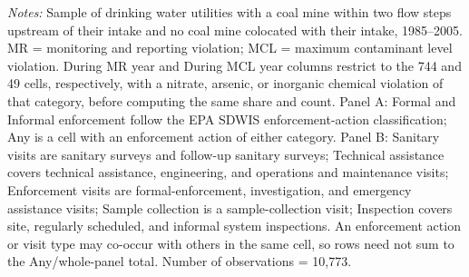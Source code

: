 \begin{table}[htbp]
\begin{minipage}{15.5682cm}
\footnotesize
\raggedright
\textit{Notes:} Sample of drinking water utilities with a coal mine within two flow steps upstream of their intake and no coal mine colocated with their intake, 1985--2005. MR = monitoring and reporting violation; MCL = maximum contaminant level violation. During MR year and During MCL year columns restrict to the 744 and 49 cells, respectively, with a nitrate, arsenic, or inorganic chemical violation of that category, before computing the same share and count. Panel A: Formal and Informal enforcement follow the EPA SDWIS enforcement-action classification; Any is a cell with an enforcement action of either category. Panel B: Sanitary visits are sanitary surveys and follow-up sanitary surveys; Technical assistance covers technical assistance, engineering, and operations and maintenance visits; Enforcement visits are formal-enforcement, investigation, and emergency assistance visits; Sample collection is a sample-collection visit; Inspection covers site, regularly scheduled, and informal system inspections. An enforcement action or visit type may co-occur with others in the same cell, so rows need not sum to the Any/whole-panel total. Number of observations = 10,773.
\end{minipage}
\end{table}
